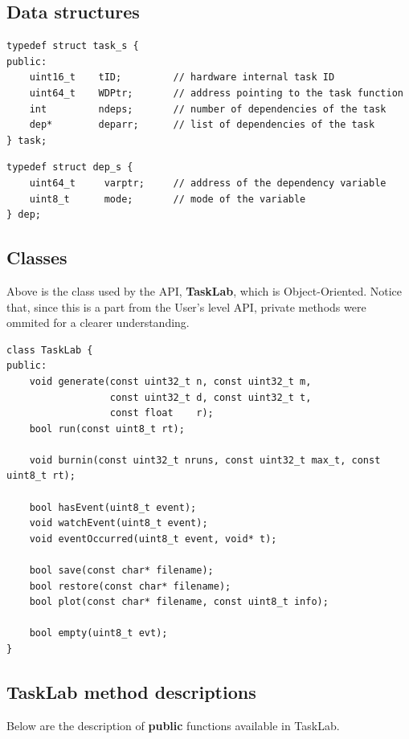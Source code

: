\subsection{Data structures}
\begin{verbatim}
typedef struct task_s {
public:
    uint16_t    tID;         // hardware internal task ID
    uint64_t    WDPtr;       // address pointing to the task function
    int         ndeps;       // number of dependencies of the task
    dep*        deparr;      // list of dependencies of the task
} task;

\end{verbatim}

\begin{verbatim}
typedef struct dep_s {
    uint64_t     varptr;     // address of the dependency variable
    uint8_t      mode;       // mode of the variable 
} dep; 
\end{verbatim}

\subsection{Classes}
Above is the class used by the API, \textbf{TaskLab}, which is Object-Oriented. Notice that, since this is a part from the User's level API, private methods were ommited for a clearer understanding.

\begin{verbatim}
class TaskLab {
public:
    void generate(const uint32_t n, const uint32_t m,
                  const uint32_t d, const uint32_t t,
                  const float    r);
    bool run(const uint8_t rt);

    void burnin(const uint32_t nruns, const uint32_t max_t, const uint8_t rt);

    bool hasEvent(uint8_t event);
    void watchEvent(uint8_t event);
    void eventOccurred(uint8_t event, void* t);

    bool save(const char* filename);
    bool restore(const char* filename);
    bool plot(const char* filename, const uint8_t info);

    bool empty(uint8_t evt);
}
\end{verbatim}

\subsection{TaskLab method descriptions}
Below are the description of \textbf{public} functions available in TaskLab.

